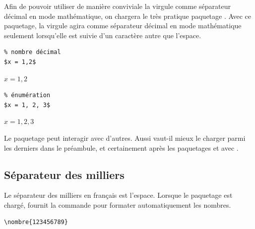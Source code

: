 Afin de pouvoir utiliser de manière conviviale la virgule comme
séparateur décimal en mode mathématique, on chargera le très pratique
paquetage  \citep{icomma}. Avec ce paquetage, la virgule
agira comme séparateur décimal en mode mathématique seulement
lorsqu'elle est suivie d'un caractère autre que l'espace.
\begin{demo}
  \begin{minipage}{0.5\linewidth}
    \begin{texample}[0.6\linewidth]
\begin{lstlisting}
% nombre décimal
$x = 1,2$
\end{lstlisting}
      \producing
      $x = 1,2$
    \end{texample}
  \end{minipage}
  \hfill
  \begin{minipage}{0.5\linewidth}
    \begin{texample}[0.6\linewidth]
\begin{lstlisting}
% énumération
$x = 1, 2, 3$
\end{lstlisting}
      \producing
      $x = 1, 2, 3$
    \end{texample}
  \end{minipage}
\end{demo}

\begin{important}
  Le paquetage  peut interagir avec d'autres. Aussi
  vaut-il mieux le charger parmi les derniers dans le préambule, et
  certainement après les paquetages  et
   avec {\XeLaTeX}.
\end{important}

\subsection{Séparateur des milliers}
\label{sec:bases:francais:milliers}

Le séparateur des milliers en français est l'espace. Lorsque le
paquetage  \citep{numprint} est chargé, 
fournit la commande \cmd{\nombre} pour formater automatiquement les
nombres.
\begin{demo}
  \begin{texample}
\begin{lstlisting}
\nombre{123456789}
\end{lstlisting}
    \producing
  \end{texample}
\end{demo}

